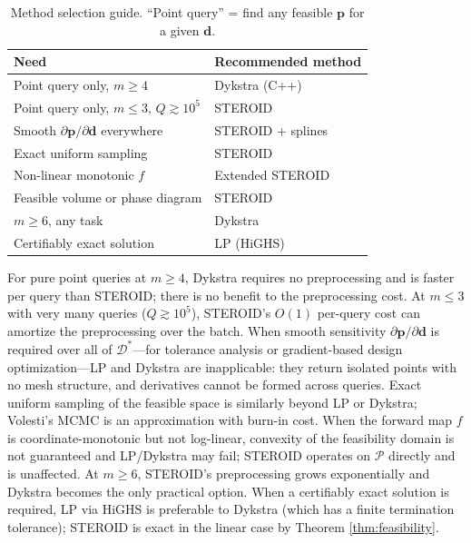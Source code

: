 \documentclass[review,onefignum,onetabnum]{./SIAM_template/siamart171218}
\begin{document}
\begin{table}[h]
	\caption{Method selection guide.  ``Point query'' = find any feasible $\mathbf{p}$
		for a given $\mathbf{d}$.}
	\label{tab:selection}
	\centering
	\begin{tabular}{p{5.5cm}l}
		\toprule
		Need                                                      & Recommended method \\
		\midrule
		Point query only, $m \geq 4$                              & Dykstra (C++)      \\
		Point query only, $m \leq 3$, $Q \gtrsim 10^5$            & STEROID            \\
		Smooth $\partial\mathbf{p}/\partial\mathbf{d}$ everywhere & STEROID + splines  \\
		Exact uniform sampling                                    & STEROID            \\
		Non-linear monotonic $f$                                  & Extended STEROID   \\
		Feasible volume or phase diagram                          & STEROID            \\
		$m \geq 6$, any task                                      & Dykstra            \\
		Certifiably exact solution                                & LP (HiGHS)         \\
		\bottomrule
	\end{tabular}
\end{table}

For pure point queries at $m \geq 4$, Dykstra requires no preprocessing and is
faster per query than STEROID; there is no benefit to the preprocessing cost.
At $m \leq 3$ with very many queries ($Q \gtrsim 10^5$), STEROID's $O(1)$
per-query cost can amortize the preprocessing over the batch.
When smooth sensitivity $\partial\mathbf{p}/\partial\mathbf{d}$ is required
over all of $\mathcal{D}^*$---for tolerance analysis or gradient-based
design optimization---LP and Dykstra are inapplicable: they return isolated
points with no mesh structure, and derivatives cannot be formed across queries.
Exact uniform sampling of the feasible space is similarly beyond LP or Dykstra;
Volesti's MCMC is an approximation with burn-in cost.
When the forward map $f$ is coordinate-monotonic but not log-linear, convexity
of the feasibility domain is not guaranteed and LP/Dykstra may fail;
STEROID operates on $\mathcal{P}$ directly and is unaffected.
At $m \geq 6$, STEROID's preprocessing grows exponentially and Dykstra becomes
the only practical option.
When a certifiably exact solution is required, LP via HiGHS \cite{HiGHS2018}
is preferable to Dykstra (which has a finite termination tolerance); STEROID is
exact in the linear case by Theorem \ref{thm:feasibility}.
\end{document}
